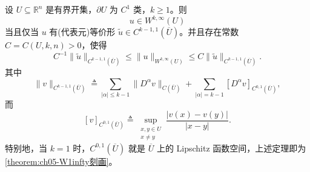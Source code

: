 \documentclass[../../main.tex]{subfiles}
\begin{document}
\begin{corollary}[$W^{k,\infty}$ 的 $C^{k-1,1}$ 刻画]
\label{corollary:ch05-Wkinfty刻画}
设 \(U\subseteq\mathbb R^n\) 是有界开集，\(\partial U\) 为 \(C^1\) 类，\(k\geqslant1\)。则
\[
u\in W^{k,\infty}(U)
\]
当且仅当 \(u\) 有(代表元)等价形 \(\widetilde u\in C^{k-1,1}(\overline U)\)。并且存在常数 \(C=C(U,k,n)>0\)，使得
\[
C^{-1}\|\widetilde u\|_{C^{k-1,1}(\overline U)}
\leqslant
\|u\|_{W^{k,\infty}(U)}
\leqslant
C\|\widetilde u\|_{C^{k-1,1}(\overline U)}.
\]
其中
\[
\|v\|_{C^{k-1,1}(\overline U)}
\triangleq
\sum_{|\alpha|\leqslant k-1}
\|D^\alpha v\|_{C(\overline U)}
+
\sum_{|\alpha|=k-1}
[D^\alpha v]_{C^{0,1}(\overline U)},
\]
而
\[
[v]_{C^{0,1}(\overline U)}
\triangleq
\sup_{\substack{x,y\in U\\ x\neq y}}
\frac{|v(x)-v(y)|}{|x-y|}.
\]
特别地，当 \(k=1\) 时，\(C^{0,1}(\overline U)\) 就是 \(\overline U\) 上的 Lipschitz 函数空间，上述定理即为\cref{theorem:ch05-W1infty刻画}。
\end{corollary}
\end{document}
